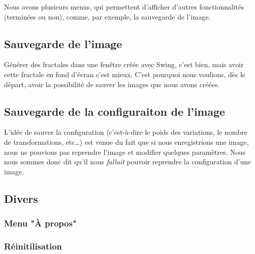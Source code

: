 \documentclass[a4paper]{article}
\begin{document}
Nous avons plusieurs menus, qui permettent d'afficher d'autres fonctionnalités (terminées ou non), comme, par exemple, la sauvegarde de l'image.

\subsection*{Sauvegarde de l'image}
Générer des fractales dans une fenêtre créée avec Swing, c'est bien, mais avoir cette fractale en fond d'écran c'est mieux. C'est pourquoi nous voulions, dès le départ, avoir la possibilité de sauver les images que nous avons créées.

\subsection*{Sauvegarde de la configuraiton de l'image}
L'idée de sauver la configuration (c'est-à-dire le poids des variations, le nombre de transformations, etc\ldots) est venue du fait que si nous enregistrions une image, nous ne pouvions pas reprendre l'image et modifier quelques paramètres. Nous nous sommes donc dit qu'il nous \textit{fallait} pouvoir reprendre la configuration d'une image.

\subsection*{Divers}
\subsubsection*{Menu "À propos"}

\subsubsection*{Réinitilisation}

\subsubsection*{}

\subsubsection*{}

\subsection*{}
\end{document}
